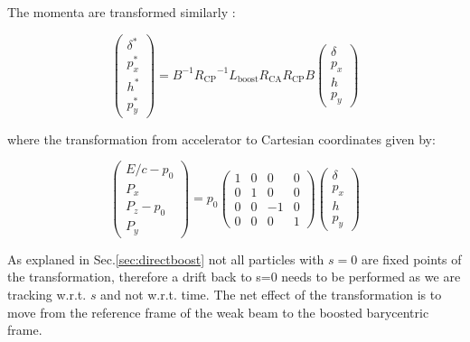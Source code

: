The momenta are transformed similarly \cite{beam_beam}:

\begin{equation}
\left( \begin{matrix}
\delta^*\\
p_x^*\\
h^*\\
p_y^*
\end{matrix} \right) = 
B^{-1}{R_{\mathrm{CP}}}^{-1}L_{\mathrm{boost}}R_{\mathrm{CA}}R_{\mathrm{CP}}B
\left( \begin{matrix}
\delta\\
p_x\\
h\\
p_y
\end{matrix} \right) 
\end{equation}

where the transformation from accelerator to Cartesian coordinates given by:

\begin{equation}
\left( \begin{matrix}
E/c-p_0\\
P_x\\
P_z-p_0\\
P_y
\end{matrix} \right) = p_0
\left( \begin{matrix}
1 &0 &0&0\\
0 &1&0 &0\\
0 &0&-1 &0\\
0 &0 &0&1
\end{matrix} \right)
\left( \begin{matrix}
\delta\\
p_x\\
h\\
p_y
\end{matrix} \right) 
\end{equation}

As explaned in Sec.\ref{sec:directboost} not all particles with $s=0$ are fixed points of the transformation, therefore a drift  back to s=0 needs to be performed as we are tracking w.r.t. $s$ and not w.r.t. time. The net effect of the transformation is to move from the reference frame of the weak beam to the boosted barycentric frame.




